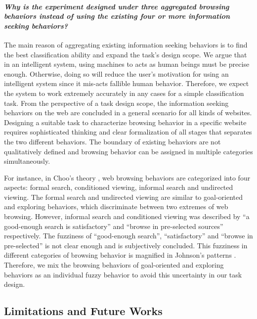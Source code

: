 \paragraph{\emph{Why is the experiment designed under three aggregated browsing behaviors instead of
using the existing four or more information seeking behaviors?}}

The main reason of aggregating existing information seeking behaviors is to find the best 
classification ability and expand the task's design scope.
We argue that in an intelligent system, using machines to acts as human beings must be 
precise enough. Otherwise, doing so will reduce the user's motivation for using 
an intelligent system since it mis-acts fallible human behavior. 
Therefore, we expect the system to work extremely accurately in any cases 
for a simple classification task.
From the perspective of a task design scope, 
the information seeking behaviors on the web 
are concluded in a general scenario for all kinds of websites. 
Designing a suitable task to characterize browsing behavior 
in a specific website requires sophisticated thinking 
and clear formalization of all stages that separates the two different behaviors.
The boundary of existing behaviors are not qualitatively defined and browsing behavior
can be assigned in multiple categories simultaneously.

For instance, in Choo's theory \cite{choo1999information}, web browsing behaviors 
are categorized into four aspects:
formal search, conditioned viewing, informal search and undirected viewing.
The formal search and undirected viewing are similar to goal-oriented and exploring behaviors,
which discriminate between two extremes of web browsing.
However, informal search and conditioned viewing was described by
``a good-enough search is satisfactory'' and ``browse in pre-selected sources'' respectively.
The fuzziness of ``good-enough search'', ``satisfactory'' and ``browse in pre-selected''
is not clear enough and is subjectively concluded. 
This fuzziness in different categories of browsing
behavior is magnified in Johnson's patterns \cite{johnson2017patterns}.
Therefore, we mix the browsing behaviors
of goal-oriented and exploring behaviors as an individual fuzzy behavior
to avoid this uncertainty in our task design.

\subsection{Limitations and Future Works}

